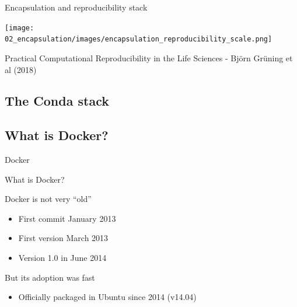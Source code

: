 \begin{frame}{Encapsulation and reproducibility stack}

\centering\texttt{[image: 02\_encapsulation/images/encapsulation\_reproducibility\_scale.png]}

Practical Computational Reproducibility in the Life Sciences - Björn Grüning et al (2018) 

\end{frame}

\subsection{The Conda stack}


\subsection{What is Docker?}

\begin{frame}{}
    \huge{Docker}
\end{frame}

\begin{frame}{What is Docker?}

Docker is not very “old”
\begin{itemize}
  \item First commit January 2013
  \item First version March 2013
  \item Version 1.0 in June 2014
\end{itemize}

But its adoption was fast
\begin{itemize}
  \item Officially packaged in Ubuntu since 2014 (v14.04) 
\end{itemize}

\end{frame}

